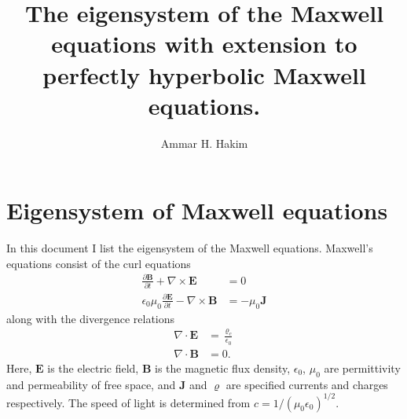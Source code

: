 \documentclass[11pt, reqno]{amsart}
\title[Maxwell Eigensystem]{The eigensystem of the Maxwell equations
  with extension to perfectly hyperbolic Maxwell equations.}%
\author{Ammar H. Hakim}%
\date{}
\newcommand{\mvec}[1]{\mathbf{#1}}
\theoremstyle{definition}
\begin{document}
\maketitle

\section{Eigensystem of Maxwell equations}

In this document I list the eigensystem of the Maxwell
equations. Maxwell's equations consist of the curl equations
\begin{align}
  \frac{\partial \mvec{B}}{\partial t} + \nabla\times\mvec{E} &= 0 \\
  \epsilon_0\mu_0\frac{\partial \mvec{E}}{\partial t} -
  \nabla\times\mvec{B} &= -\mu_0\mvec{J}
\end{align}
along with the divergence relations
\begin{align}
  \nabla\cdot\mvec{E} &= \frac{\varrho_c}{\epsilon_0} \label{eq:divE} \\
  \nabla\cdot\mvec{B} &= 0. \label{eq:divB}
\end{align}
Here, $\mvec{E}$ is the electric field, $\mvec{B}$ is the magnetic
flux density, $\epsilon_0$, $\mu_0$ are permittivity and permeability
of free space, and $\mvec{J}$ and $\varrho$ are specified currents and
charges respectively. The speed of light is determined from
$c=1/(\mu_0\epsilon_0)^{1/2}$.
\end{document}
